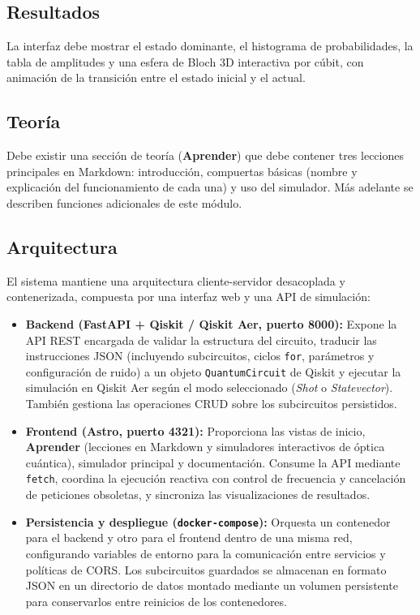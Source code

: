\documentclass{article}
\begin{document}
\subsection{Resultados}
La interfaz debe mostrar el estado dominante, el histograma de probabilidades, la tabla de amplitudes y una esfera de Bloch 3D interactiva por cúbit, con animación de la transición entre el estado inicial y el actual.

\subsection{Teoría}
Debe existir una sección de teoría (\textbf{Aprender}) que debe contener tres lecciones principales en Markdown: introducción, compuertas básicas (nombre y explicación del funcionamiento de cada una) y uso del simulador. Más adelante se describen funciones adicionales de este módulo.

\subsection{Arquitectura}
El sistema mantiene una arquitectura cliente-servidor desacoplada y contenerizada, compuesta por una interfaz web y una API de simulación:

\begin{itemize}
  \item \textbf{Backend (FastAPI + Qiskit / Qiskit Aer, puerto 8000):} Expone la API REST encargada de validar la estructura del circuito, traducir las instrucciones JSON (incluyendo subcircuitos, ciclos \texttt{for}, parámetros y configuración de ruido) a un objeto \texttt{QuantumCircuit} de Qiskit y ejecutar la simulación en Qiskit Aer según el modo seleccionado (\textit{Shot} o \textit{Statevector}). También gestiona las operaciones CRUD sobre los subcircuitos persistidos.
  \item \textbf{Frontend (Astro, puerto 4321):} Proporciona las vistas de inicio, \textbf{Aprender} (lecciones en Markdown y simuladores interactivos de óptica cuántica), simulador principal y documentación. Consume la API mediante \texttt{fetch}, coordina la ejecución reactiva con control de frecuencia y cancelación de peticiones obsoletas, y sincroniza las visualizaciones de resultados.
  \item \textbf{Persistencia y despliegue (\texttt{docker-compose}):} Orquesta un contenedor para el backend y otro para el frontend dentro de una misma red, configurando variables de entorno para la comunicación entre servicios y políticas de CORS. Los subcircuitos guardados se almacenan en formato JSON en un directorio de datos montado mediante un volumen persistente para conservarlos entre reinicios de los contenedores.
\end{itemize}
\end{document}
